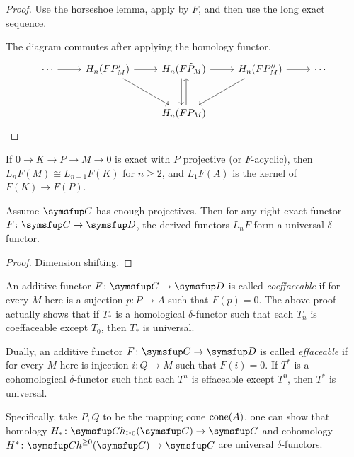\begin{proof}
  Use the horseshoe lemma, apply by $F$, and then use the long exact sequence.

  The diagram commutes after applying the homology functor.
  \begin{equation*}
    \begin{tikzcd}[row sep=large]
      \dotsb & H_n(FP_M') & H_n(F\tilde{P}_M) & H_n(FP_M'') & \dotsb\\
      & & H_n(FP_M)
      \arrow[from=1-1,]{1-2}[]{}
      \arrow[from=1-2,]{1-3}[]{}
      \arrow[from=1-3,]{1-4}[]{}
      \arrow[from=1-4,]{1-5}[]{}
      \arrow[from=1-2]{2-3}[]{}
      \arrow[from=1-3,shift right,]{2-3}[]{}
      \arrow[from=1-3,shift left,leftarrow]{2-3}[]{}
      \arrow[from=1-4]{2-3}[]{}
    \end{tikzcd}
  \end{equation*}
\end{proof}

\begin{remark}
  If $0\to K\to P\to M\to 0$ is exact with $P$ projective (or $F$-acyclic), then $L_nF(M)\cong L_{n-1}F(K)$ for $n\geq 2$, and $L_1F(A)$ is the kernel of $F(K)\to F(P)$.
\end{remark}

\begin{theorem}
  Assume $\CAT{C}$ has enough projectives. Then for any right exact functor $F\colon\CAT{C}\to\CAT{D}$, the derived functors $L_nF$ form a universal $\delta$-functor.
\end{theorem}

\begin{proof}
  Dimension shifting.
\end{proof}

\begin{remark}
  An additive functor $F\colon\CAT{C}\to\CAT{D}$ is called \emph{coeffaceable} if for every $M$ here is a sujection $p\colon P\to A$ such that $F(p)=0$. The above proof actually shows that if $T_*$ is a homological $\delta$-functor such that each $T_n$ is coeffaceable except $T_0$, then $T_*$ is universal.

  Dually, an additive functor $F\colon\CAT{C}\to\CAT{D}$ is called \emph{effaceable} if for every $M$ here is injection $i\colon Q\to M$ such that $F(i)=0$. If $T^*$ is a cohomological $\delta$-functor such that each $T^n$ is effaceable except $T^0$, then $T^*$ is universal.

  Specifically, take $P, Q$ to be the mapping cone $\operatorname{cone}(A)$, one can show that homology $H_*\colon \CHH(\CAT{C})\to \CAT{C}$ and cohomology $H^*\colon \CHC(\CAT{C})\to \CAT{C}$ are universal $\delta$-functors.
\end{remark}

